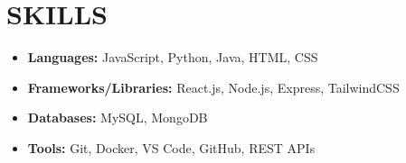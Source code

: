 \documentclass{article}
\begin{document}
\section*{SKILLS}
\begin{itemize}[label=$\bullet$]
    \item \textbf{Languages:} JavaScript, Python, Java, HTML, CSS
    \item \textbf{Frameworks/Libraries:} React.js, Node.js, Express, TailwindCSS
    \item \textbf{Databases:} MySQL, MongoDB
    \item \textbf{Tools:} Git, Docker, VS Code, GitHub, REST APIs
\end{itemize}
\end{document}
